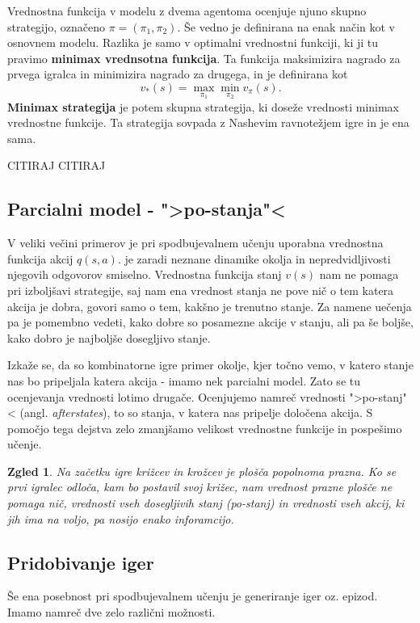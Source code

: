 \documentclass[12pt,a4paper]{amsart}
\theoremstyle{definition} %
\theoremstyle{plain} %
\newtheorem{zgled}[definicija]{Zgled}
\begin{document}
Vrednostna funkcija v modelu z dvema agentoma ocenjuje njuno skupno strategijo, označeno $\pi = (\pi_1, 
\pi_2)$. Še vedno je definirana na enak način kot v osnovnem modelu. Razlika je samo v optimalni 
vrednostni funkciji, ki ji tu pravimo \textbf{minimax vrednsotna funkcija}. Ta funkcija maksimizira 
nagrado za prvega igralca in minimizira nagrado za drugega, in je definirana kot
$$
v_*(s) = \max_{\pi_1} \min_{\pi_2} v_\pi(s).
$$
\textbf{Minimax strategija} je potem skupna strategija, ki doseže vrednosti minimax vrednostne funkcije. 
Ta strategija sovpada z Nashevim ravnotežjem igre in je ena sama.

CITIRAJ CITIRAJ

\subsection{Parcialni model - ">po-stanja"<}
V veliki večini primerov je pri spodbujevalnem učenju uporabna vrednostna funkcija akcij $q(s, a)$. 
je zaradi neznane dinamike okolja in nepredvidljivosti njegovih odgovorov smiselno. Vrednostna 
funkcija stanj $v(s)$ nam ne pomaga pri izboljšavi strategije, saj nam ena vrednost stanja ne pove 
nič o tem katera akcija je dobra, govori samo o tem, kakšno je trenutno stanje. Za namene uečenja 
pa je pomembno vedeti, kako dobre so posamezne akcije v stanju, ali pa še boljše, kako dobro je 
najboljše dosegljivo stanje. 

Izkaže se, da so kombinatorne igre primer okolje, kjer točno vemo, v katero stanje nas bo pripeljala 
katera akcija - imamo nek parcialni model. Zato se tu ocenjevanja vrednosti lotimo drugače. Ocenjujemo 
namreč vrednosti ">po-stanj"< (angl. \textit{afterstates}), to so stanja, v katera nas pripelje 
določena akcija. S pomočjo tega dejstva zelo zmanjšamo velikost vrednostne funkcije in pospešimo učenje.

\begin{zgled}
    Na začetku igre križcev in krožcev je plošča popolnoma prazna. Ko se prvi igralec odloča, kam bo 
    postavil svoj križec, nam vrednost prazne plošče ne pomaga nič, vrednosti vseh dosegljivih stanj 
    (po-stanj) in vrednosti vseh akcij, ki jih ima na voljo, pa nosijo enako inforamcijo.
\end{zgled}

\subsection{Pridobivanje iger}
Še ena posebnost pri spodbujevalnem učenju je generiranje iger oz. epizod. Imamo namreč dve zelo 
različni možnosti. 
\end{document}

